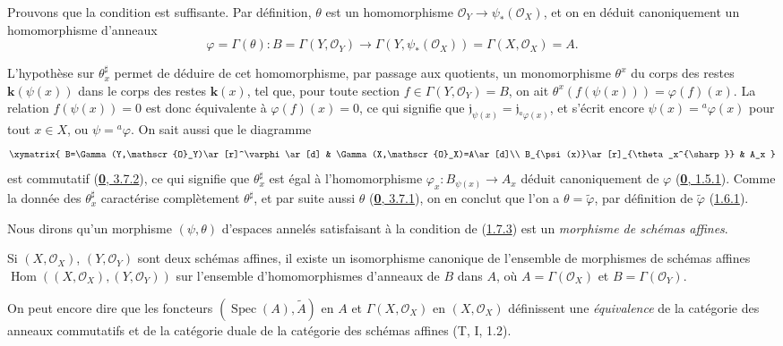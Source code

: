 Prouvons que la condition est suffisante. Par définition, $\theta$ est un
homomorphisme $\mathscr{O}_Y\to\psi_*(\mathscr{O}_X)$, et on en déduit
canoniquement un homomorphisme d'anneaux
\[
  \varphi=\Gamma(\theta):
  B=\Gamma(Y,\mathscr{O}_Y)
  \longrightarrow
  \Gamma(Y,\psi_*(\mathscr{O}_X))=\Gamma(X,\mathscr{O}_X)=A.
\]

L'hypothèse sur $\theta_x^{\sharp}$ permet de déduire de cet homomorphisme, par
passage aux quotients, un monomorphisme $\theta^x$ du corps des restes
$\boldsymbol{k}(\psi(x))$ dans le corps des restes $\boldsymbol{k}(x)$, tel que, pour toute section
$f\in\Gamma(Y,\mathscr{O}_Y)=B$, on ait
$\theta^x(f(\psi(x)))=\varphi(f)(x)$. La relation $f(\psi(x))=0$ est donc
équivalente à $\varphi(f)(x)=0$, ce qui signifie que
$\mathfrak{j}_{\psi(x)}=\mathfrak{j}_{{}^a\varphi(x)}$, et s'écrit encore
$\psi(x)={}^a\varphi(x)$ pour tout $x\in X$, ou $\psi={}^a\varphi$. On sait
aussi que le diagramme
\label{I.1.7.3.diagram-fr}
\[
  \xymatrix{
    B=\Gamma(Y,\mathscr{O}_Y)\ar[r]^\varphi\ar[d] &
    \Gamma(X,\mathscr{O}_X)=A\ar[d]\\
    B_{\psi(x)}\ar[r]_{\theta_x^{\sharp}} & A_x
  }
\]
est commutatif (\hyperref[0.3.7.2-fr]{\textbf{0}, 3.7.2}), ce qui signifie que
$\theta_x^{\sharp}$ est égal à l'homomorphisme
$\varphi_x:B_{\psi(x)}\to A_x$ déduit canoniquement de $\varphi$
(\hyperref[0.1.5.1-fr]{\textbf{0}, 1.5.1}). Comme la donnée des $\theta_x^{\sharp}$
caractérise complètement $\theta^{\sharp}$, et par suite aussi $\theta$
(\hyperref[0.3.7.1-fr]{\textbf{0}, 3.7.1}), on en conclut que l'on a
$\theta=\widetilde\varphi$, par définition de $\widetilde\varphi$
(\hyperref[I.1.6.1-fr]{1.6.1}).

Nous dirons qu'un morphisme $(\psi,\theta)$ d'espaces annelés satisfaisant à
la condition de (\hyperref[I.1.7.3-fr]{1.7.3}) est un \emph{morphisme de
schémas affines}.

\begin{corollary}[1.7.4]
\label{I.1.7.4-fr}
Si $(X,\mathscr{O}_X)$, $(Y,\mathscr{O}_Y)$ sont deux schémas affines, il
existe un isomorphisme canonique de l'ensemble de morphismes de schémas
affines
$\operatorname{Hom}((X,\mathscr{O}_X),(Y,\mathscr{O}_Y))$ sur l'ensemble
d'homomorphismes d'anneaux de $B$ dans $A$, où
$A=\Gamma(\mathscr{O}_X)$ et $B=\Gamma(\mathscr{O}_Y)$.
\end{corollary}

On peut encore dire que les foncteurs $(\operatorname{Spec}(A),\widetilde A)$
en $A$ et $\Gamma(X,\mathscr{O}_X)$ en $(X,\mathscr{O}_X)$ définissent une
\emph{équivalence} de la catégorie des anneaux commutatifs et de la catégorie
duale de la catégorie des schémas affines (T, I, 1.2).

